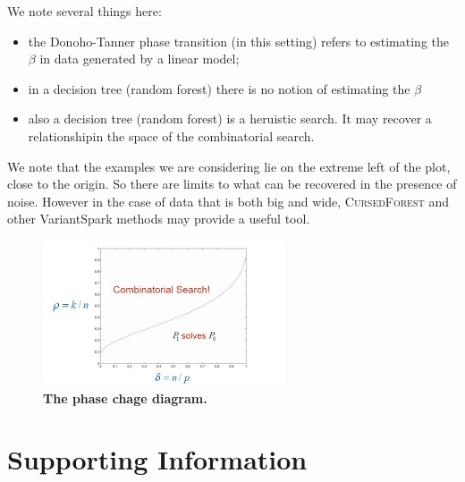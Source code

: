 \documentclass[10pt,letterpaper]{article}
\newcommand{\cursedforest}{\textsc{CursedForest}\xspace}
\begin{document}
We note several things here:
\begin{itemize}
\item the Donoho-Tanner phase transition (in this setting) refers to estimating the $\beta$ in data generated by a
  linear model;
\item in a decision tree (random forest) there is no notion of estimating the $\beta$
\item also a decision tree (random forest) is a heruistic search. It may recover a relationshipin the space
  of the combinatorial search.
\end{itemize}

We note that the examples we are considering lie on the extreme left of the plot, close to the origin. So there are
limits to what can be recovered in the presence of noise. However in the case of data that is both big and wide,
\cursedforest and other VariantSpark methods may provide a useful tool.


\begin{figure}[tbhp] 
 \begin{adjustwidth}{-1.00in}{0in}
    \centering
    \includegraphics[totalheight=6cm]{./figs/phase.png} 
    \caption{{\bf The phase chage diagram.}}
    \label{figure:phase-diagram-equivalence.png} 
    \vspace{4ex}
  \end{adjustwidth}
\end{figure}


\clearpage
\section{Supporting Information}

\end{document}
